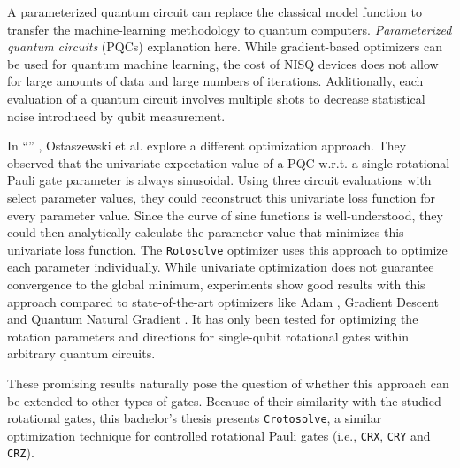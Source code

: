 A parameterized quantum circuit can replace the classical model function to
transfer the machine-learning methodology to quantum computers.
\emph{Parameterized quantum circuits} (PQCs) explanation here. %
While gradient-based optimizers can be used for quantum machine learning,
the cost of NISQ devices does not allow for large amounts of data and large
numbers of iterations.
Additionally, each evaluation of a quantum circuit involves multiple shots to
decrease statistical noise introduced by qubit measurement.

In ``\emph{}''
\cite{ostaszewski_structure_2021}, Ostaszewski et al. explore a different
optimization approach.
They observed that the univariate expectation value of a PQC w.r.t. a single
rotational Pauli gate parameter is always sinusoidal.
Using three circuit evaluations with select parameter values, they could
reconstruct this univariate loss function for every parameter value.
Since the curve of sine functions is well-understood, they could then
analytically calculate the parameter value that minimizes this univariate loss
function.
The \texttt{Rotosolve} optimizer uses this approach to optimize each parameter
individually.
While univariate optimization does not guarantee convergence to the global
minimum, experiments show good results with this approach compared to
state-of-the-art optimizers like Adam \cite{kingma_adam_2017},
Gradient Descent and Quantum Natural Gradient \cite{stokes_quantum_2020}.
It has only been tested for optimizing the rotation parameters and directions
for single-qubit rotational gates within arbitrary quantum circuits.

These promising results naturally pose the question of whether this approach can
be extended to other types of gates.
Because of their similarity with the studied rotational gates, this bachelor's
thesis presents \texttt{Crotosolve}, a similar optimization technique for
controlled rotational Pauli gates (i.e., \texttt{CRX}, \texttt{CRY} and
\texttt{CRZ}).


